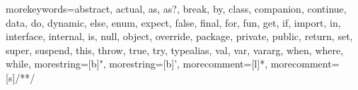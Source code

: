 
\renewcommand*{\lstlistingname}{Code}
\renewcommand*{\lstlistlistingname}{Codeverzeichnis}

 {
    morekeywords={abstract, actual, as, as?, break, by, class, companion, continue, data, do, dynamic, else, enum, expect, false, final, for, fun, get, if, import, in, interface, internal, is, null, object, override, package, private, public, return, set, super, suspend, this, throw, true, try, typealias, val, var, vararg, when, where, while},
    morestring=[b]",
    morestring=[b]',
    morecomment=[l]{*},
    morecomment=[s]{/*}{*/}
}


